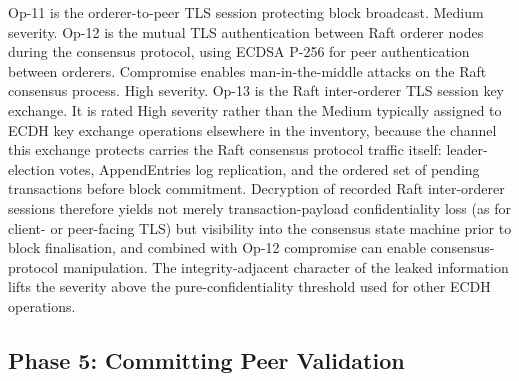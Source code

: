 \documentclass[conference]{IEEEtran}
\begin{document}
Op-11 is the orderer-to-peer TLS session protecting block broadcast.
Medium severity. Op-12 is the mutual TLS authentication between Raft
orderer nodes during the consensus protocol, using ECDSA P-256 for peer
authentication between orderers. Compromise enables man-in-the-middle
attacks on the Raft consensus process. High severity. Op-13 is the Raft inter-orderer TLS session key exchange. It is rated
High severity rather than the Medium typically assigned to ECDH key
exchange operations elsewhere in the inventory, because the channel
this exchange protects carries the Raft consensus protocol traffic
itself: leader-election votes, AppendEntries log replication, and the
ordered set of pending transactions before block commitment.
Decryption of recorded Raft inter-orderer sessions therefore yields
not merely transaction-payload confidentiality loss (as for client- or
peer-facing TLS) but visibility into the consensus state machine
prior to block finalisation, and combined with Op-12 compromise can
enable consensus-protocol manipulation. The integrity-adjacent
character of the leaked information lifts the severity above the
pure-confidentiality threshold used for other ECDH operations.

\subsection{Phase 5: Committing Peer Validation}
\end{document}
